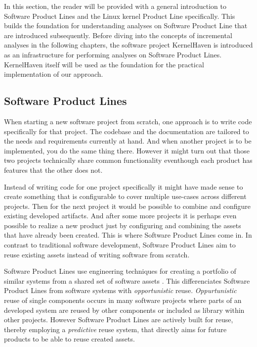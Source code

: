 \documentclass[a4paper]{article}
\begin{document}
In this section, the reader will be provided with a general introduction to Software Product Lines and the Linux kernel Product Line specifically. This builds the foundation for understanding analyses on Software Product Line that are introduced subsequently. Before diving into the concepts of incremental analyses in the following chapters, the software project KernelHaven is introduced as an infrastructure for performing analyses on Software Product Lines. KernelHaven itself will be used as the foundation for the practical implementation of our approach.

\subsection{Software Product Lines}\label{spl}

When starting a new software project from scratch, one approach is to write code specifically for that project. The codebase and the documentation are tailored to the needs and requirements currently at hand. And when another project is to be implemented, you do the same thing there. However it might turn out that those two projects technically share common functionality eventhough each product has features that the other does not.

Instead of writing code for one project specifically it might have made sense to create something that is configurable to cover multiple use-cases across different projects. Then for the next project it would be possible to combine and configure existing developed artifacts. And after some more projects it is perhaps even possible to realize a new product just by configuring and combining the assets that have already been created. This is where Software Product Lines come in. In contrast to traditional software development, Software Product Lines aim to reuse existing assets instead of writing software from scratch.

Software Product Lines use engineering techniques for creating a portfolio of similar systems from a shared set of software assets \cite{intro-spl}. This differenciates Software Product Lines from software systems with \emph{opportunistic} reuse. \emph{Oppurtunistic} reuse of single components occurs in many software projects where parts of an developed system are reused by other components or included as library within other projects. However Software Product Lines are actively built for reuse, thereby employing a \emph{predictive} reuse system, that directly aims for future products to be able to reuse created assets.
\end{document}
